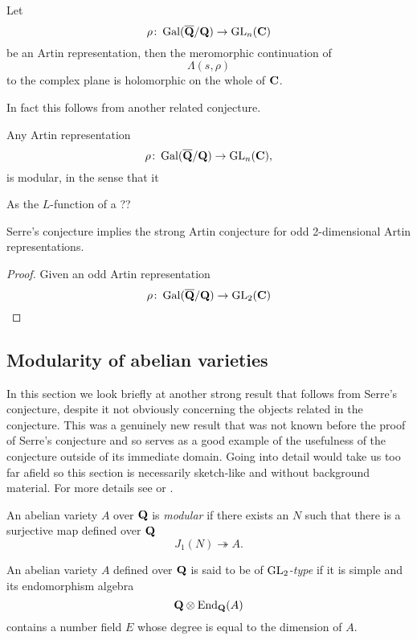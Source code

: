 \documentclass[a4paper,12pt]{article}
\begin{document}
\begin{conjecture}
Let
\[
\rho\colon \operatorname{Gal}(\overline{\mathbf{Q}}/\mathbf{Q}) \to \operatorname{GL}_n(\mathbf{C})
\]
be an Artin representation, then the meromorphic continuation of
\[
\Lambda(s,\rho)
\]
to the complex plane is holomorphic on the whole of $\mathbf{C}$.
\end{conjecture}

In fact this follows from another related conjecture.

\begin{conjecture}
Any Artin representation
\[
\rho\colon \operatorname{Gal}(\overline{\mathbf{Q}}/\mathbf{Q}) \to \operatorname{GL}_n(\mathbf{C}),
\]
is modular, in the sense that it
\end{conjecture}

As the $L$-function of a ??

\begin{prop}
Serre's conjecture implies the strong Artin conjecture for odd 2-dimensional Artin representations.
\end{prop}
\begin{proof}
Given an odd Artin representation
\[
\rho\colon \operatorname{Gal}(\overline{\mathbf{Q}}/\mathbf{Q})\to \operatorname{GL}_2(\mathbf{C})
\]

\end{proof}

\fi

\subsection{Modularity of abelian varieties}
In this section we look briefly at another strong result that follows from Serre's conjecture, despite it not obviously concerning the objects related in the conjecture.
This was a genuinely new result that was not known before the proof of Serre's conjecture and so serves as a good example of the usefulness of the conjecture outside of its immediate domain.
Going into detail would take us too far afield so this section is necessarily sketch-like and without background material.
For more details see \cite{Ribet04} or \cite[chap. 15]{RibetSteinBook}.

\begin{defn}
An abelian variety $A$ over $\mathbf{Q}$ is \emph{modular} if there exists an $N$ such that there is a surjective map defined over $\mathbf{Q}$
\[
J_1(N) \twoheadrightarrow A.
\]
\end{defn}

\begin{defn}
An abelian variety $A$ defined over $\mathbf{Q}$ is said to be of \emph{$\operatorname{GL}_2$-type} if it is simple and its endomorphism algebra
\[
\mathbf{Q}\otimes \operatorname{End}_{\mathbf{Q}}(A)
\]
contains a number field $E$ whose degree is equal to the dimension of $A$.
\end{defn}
\end{document}
